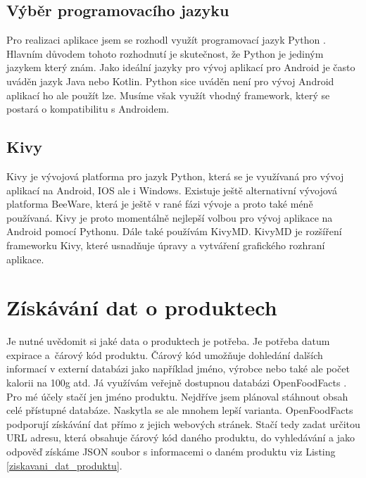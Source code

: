 \documentclass[12pt, a4paper, oneside]{report}
\begin{document}
\section*{Výběr programovacího jazyku}
Pro realizaci aplikace jsem se rozhodl využít programovací jazyk Python \cite{python}. Hlavním důvodem tohoto rozhodnutí je skutečnost, že Python je jediným jazykem který znám. Jako ideální jazyky pro vývoj aplikací pro Android je často uváděn jazyk Java nebo Kotlin. Python sice uváděn není pro vývoj Android aplikací ho ale použít lze. Musíme však využít vhodný framework, který se postará o kompatibilitu s Androidem.

\section*{Kivy}
Kivy je vývojová platforma pro jazyk Python, která se je využívaná pro vývoj aplikací na Android, IOS ale i Windows. Existuje ještě alternativní vývojová platforma BeeWare, která je ještě v rané fázi vývoje a proto také méně používaná. Kivy je proto momentálně nejlepší volbou pro vývoj aplikace na Android pomocí Pythonu. Dále také používám KivyMD. KivyMD je rozšíření frameworku Kivy, které usnadňuje úpravy a vytváření grafického rozhraní aplikace.
\chapter{Získávání dat o produktech}
Je nutné uvědomit si jaké data o produktech je potřeba. Je potřeba datum expirace a~čárový kód produktu. Čárový kód umožňuje dohledání dalších informací v externí databázi jako například jméno, výrobce nebo také ale počet kalorii na 100g atd. Já využívám veřejně dostupnou databázi OpenFoodFacts \cite{openfoodfacts}. Pro mé účely stačí jen jméno produktu.
Nejdříve jsem plánoval stáhnout obsah celé přístupné databáze. Naskytla se ale mnohem lepší varianta. OpenFoodFacts podporují získávání dat přímo z jejich webových stránek. Stačí tedy zadat určitou URL adresu, která obsahuje čárový kód daného produktu, do vyhledávání a jako odpověď získáme JSON soubor s informacemi o daném produktu viz Listing \ref{ziskavani_dat_produktu}. 
\end{document}
